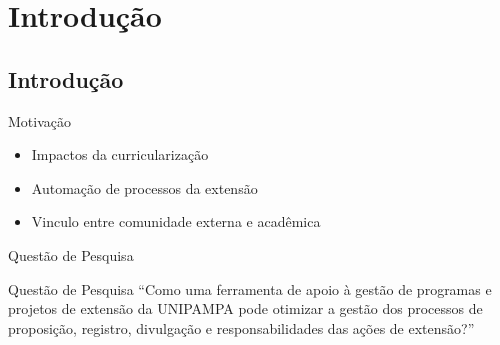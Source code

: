 
\section{Introdução}
\subsection*{Introdução}


\begin{frame}{{\sffamily Motivação}}
\begin{block}{}
    \begin{itemize}%
		\item Impactos da curricularização %
		\item Automação de processos da extensão
		\item Vinculo entre comunidade externa e acadêmica
		    
	\end{itemize}
\end{block}
\end{frame}

\begin{frame}{{\sffamily Questão de Pesquisa}}
\begin{block}{Questão de Pesquisa}
“Como uma ferramenta de apoio à gestão de programas e projetos de extensão da UNIPAMPA pode otimizar a gestão dos processos de proposição, registro, divulgação e responsabilidades das ações de extensão?” 
\end{block}
\end{frame}

